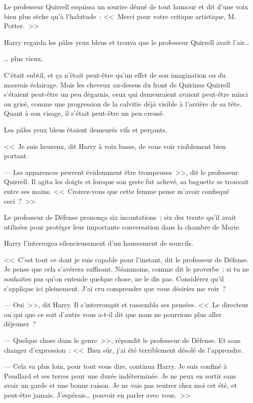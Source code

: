 Le professeur Quirrell esquissa un sourire dénué de tout humour et dit d'une voix bien plus sèche qu'à l'habitude~: <<~Merci pour votre critique artistique, M. Potter.~>>

Harry regarda les pâles yeux bleus et trouva que le professeur Quirrell avait l'air…

… plus vieux.

C'était subtil, et ça n'était peut-être qu'un effet de son imagination ou du mauvais éclairage. Mais les cheveux au-dessus du front de Quirinus Quirrell s'étaient peut-être un peu dégarnis, ceux qui demeuraient avaient peut-être minci ou grisé, comme une progression de la calvitie déjà visible à l'arrière de sa tête. Quant à son visage, il s'était peut-être un peu creusé.

Les pâles yeux bleus étaient demeurés vifs et perçants.

<<~Je suis heureux, dit Harry à voix basse, de vous voir visiblement bien portant.

--- Les apparences peuvent évidemment être trompeuses~>>, dit le professeur Quirrell. Il agita les doigts et lorsque son geste fut achevé, sa baguette se trouvait entre ses mains. <<~Croirez-vous que cette femme pense m'avoir confisqué ceci~?~>>

Le professeur de Défense prononça six incantations~; six des trente qu'il avait utilisées pour protéger leur importante conversation dans la chambre de Marie.

Harry l'interrogea silencieusement d'un haussement de sourcils.

<<~C'est tout ce dont je suis capable pour l'instant, dit le professeur de Défense. Je pense que cela s'avérera suffisant. Néanmoins, comme dit le proverbe~: si tu ne souhaites pas qu'on entende quelque chose, ne le dis pas. Considérez qu'il s'applique ici pleinement. J'ai cru comprendre que vous désiriez me voir~?

--- Oui~>>, dit Harry. Il s'interrompit et rassembla ses pensées. <<~Le directeur ou qui que ce soit d'autre vous a-t-il dit que nous ne pourrions plus aller déjeuner~?

--- Quelque chose dans le genre~>>, répondit le professeur de Défense. Et sans changer d'expression~: <<~Bien sûr, j'ai été terriblement désolé de l'apprendre.

--- Cela va plus loin, pour tout vous dire, continua Harry. Je suis confiné à Poudlard et ses terres pour une durée indéterminée. Je ne peux en sortir sans avoir un garde et une bonne raison. Je ne vais pas rentrer chez moi cet été, et peut-être jamais. J'espérais… pouvoir en parler avec vous.~>>

